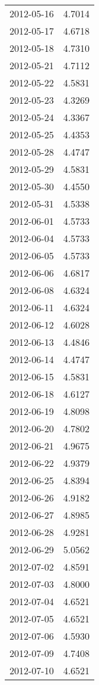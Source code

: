 \begin{tabular}{lr}
2012-05-16 &      4.7014 \\
2012-05-17 &      4.6718 \\
2012-05-18 &      4.7310 \\
2012-05-21 &      4.7112 \\
2012-05-22 &      4.5831 \\
2012-05-23 &      4.3269 \\
2012-05-24 &      4.3367 \\
2012-05-25 &      4.4353 \\
2012-05-28 &      4.4747 \\
2012-05-29 &      4.5831 \\
2012-05-30 &      4.4550 \\
2012-05-31 &      4.5338 \\
2012-06-01 &      4.5733 \\
2012-06-04 &      4.5733 \\
2012-06-05 &      4.5733 \\
2012-06-06 &      4.6817 \\
2012-06-08 &      4.6324 \\
2012-06-11 &      4.6324 \\
2012-06-12 &      4.6028 \\
2012-06-13 &      4.4846 \\
2012-06-14 &      4.4747 \\
2012-06-15 &      4.5831 \\
2012-06-18 &      4.6127 \\
2012-06-19 &      4.8098 \\
2012-06-20 &      4.7802 \\
2012-06-21 &      4.9675 \\
2012-06-22 &      4.9379 \\
2012-06-25 &      4.8394 \\
2012-06-26 &      4.9182 \\
2012-06-27 &      4.8985 \\
2012-06-28 &      4.9281 \\
2012-06-29 &      5.0562 \\
2012-07-02 &      4.8591 \\
2012-07-03 &      4.8000 \\
2012-07-04 &      4.6521 \\
2012-07-05 &      4.6521 \\
2012-07-06 &      4.5930 \\
2012-07-09 &      4.7408 \\
2012-07-10 &      4.6521 \\

\end{tabular}
